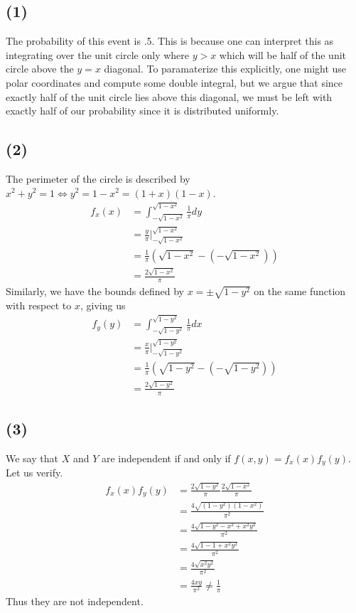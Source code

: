 \documentclass{article}
\theoremstyle{definition}
\begin{document}
    \subsection*{(1)}
        The probability of this event is .5. This is because one can interpret this as 
        integrating over the unit circle only where $y > x$ which will be half of the unit circle
        above the $y = x$ diagonal. To paramaterize this explicitly, one might use polar coordinates and compute 
        some double integral, but we argue that since exactly half of the unit circle lies above this diagonal,
        we must be left with exactly half of our probability since it is distributed uniformly.
    \subsection*{(2)}
        The perimeter of the circle is described by $x^2 + y^2 = 1 \Longleftrightarrow y^2 = 1 - x^2 = (1 + x)(1 - x)$.
        \begin{align*}
            f_x(x) &= \int_{-\sqrt{1-x^2}}^{\sqrt{1-x^2}} \frac{1}{\pi} dy\\
            &= \frac{y}{\pi} \bigg|_{-\sqrt{1-x^2}}^{\sqrt{1-x^2}}\\
            &= \frac{1}{\pi} \left( \sqrt{1-x^2} - (-\sqrt{1-x^2})\right)\\
            &= \frac{2 \sqrt{1-x^2}}{\pi}
        \end{align*}
        Similarly, we have the bounds defined by $x = \pm \sqrt{1 - y^2}$ on the same function with respect to $x$, 
        giving us
        \begin{align*}
            f_y(y) &= \int_{-\sqrt{1-y^2}}^{\sqrt{1-y^2}} \frac{1}{\pi} dx\\
            &= \frac{x}{\pi} \bigg|_{-\sqrt{1-y^2}}^{\sqrt{1-y^2}}\\
            &= \frac{1}{\pi} \left( \sqrt{1-y^2} - (-\sqrt{1-y^2})\right)\\
            &= \frac{2 \sqrt{1-y^2}}{\pi}
        \end{align*}
    \subsection*{(3)}
        We say that $X$ and $Y$ are independent if and only if $f(x,y) = f_x(x)f_y(y)$. Let us  verify.
        \begin{align*}
            f_x(x)f_y(y) & = \frac{2 \sqrt{1-y^2}}{\pi} \frac{2 \sqrt{1-x^2}}{\pi}\\
            &= \frac{4 \sqrt{(1 - y^2)(1 - x^2)}}{\pi^2} \\
            &= \frac{4 \sqrt{1 - y^2 - x^2 + x^2 y^2}}{\pi^2} \\
            &= \frac{4 \sqrt{1 - 1 + x^2 y^2}}{\pi^2} \\
            &= \frac{4 \sqrt{x^2 y^2}}{\pi^2} \\
            &= \frac{4xy}{\pi^2} \neq \frac{1}{\pi}
        \end{align*}
        Thus they are not independent.
\end{document}
